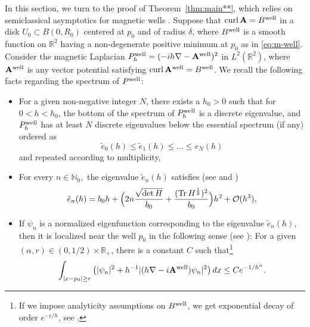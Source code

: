 \documentclass[11pt]{amsart}
\theoremstyle{remark}
\newcommand{\bA}{\mathbf{A}}
\newcommand{\R}{\mathbb{R}}
\DeclareMathOperator{\Curl}{curl}
\numberwithin{equation}{section}
\begin{document}
In this section, we turn to the proof of Theorem~\ref{thm:main**}, which relies on semiclassical asymptotics for magnetic wells \cite{HK}. Suppose that $\Curl\bA=B^{\rm well}$ in a disk $U_0\subset B(0,R_0)$ centered at $p_0$ and of radius $\delta$, where $B^{\rm well}$ is a smooth function on $\R^2$ having a non-degenerate positive minimum at $p_0$ as in \eqref{eq:m-well}. Consider the magnetic Laplacian  $P^{\rm well}_{h}=(-ih\nabla-\bA^{\rm well})^2$ in $L^2(\R^2)$, where $\bA^{\rm well}$ is any vector potential satisfying $\Curl\bA^{\rm well}=B^{\rm well}$. We recall the following facts regarding the spectrum of $P^{\rm well}$:
\begin{itemize}
    \item For a given non-negative integer $N$, there exists a $h_0>0$ such that for $0<h<h_0$, the bottom of the spectrum of $P^{\rm well}_{h}$ is a discrete eigenvalue, and $P^{\rm well}_{h}$ has at least $N$ discrete eigenvalues below the essential spectrum (if any) ordered as 
    \[\tilde e_0(h)\leq\tilde e_1(h)\leq \dots \leq e_N(h)\]
    and repeated according to multiplicity,
    \item For every $n\in\mathbb N_0,$ the eigenvalue $\tilde e_n(h)$ satisfies (see \cite[Theorem~1.2]{HK} and \cite[Corollary~1.7]{RV})
    \begin{equation}\label{eq:asymp-en}
\tilde e_n(h)=b_0h+\Bigl(2n\frac{\sqrt{\mathrm{det}\,H}}{b_0}+\frac{(\mathrm{Tr}\,H^{\frac12})^2}{b_0}\Bigr)h^2+\mathcal O(h^{3}),
    \end{equation}
    \item If $\psi_n$ is a normalized eigenfunction corresponding to the eigenvalue $\tilde e_n(h)$, then it is localized near the well $p_0$ in the following sense (see \cite[Proposition~4.1]{RV}): For a given $(\alpha,r)\in(0,1/2)\times\R_+$, there is a constant $C$ such that\footnote{If we impose analyticity assumptions on $B^{\rm well}$, we get exponential decay of order $e^{-\epsilon/h}$, see \cite{GRV}.}
    \begin{equation}\label{eq:dec-ef-en}
\int_{|x-p_0|\geq r} \left( |\psi_{n}|^2 + h^{-1} |(h\nabla - i\bA^{\rm well})\psi_{n}|^2 \right) dx \le Ce^{-1/h^{\alpha}}.
    \end{equation}
\end{itemize}
\end{document}
